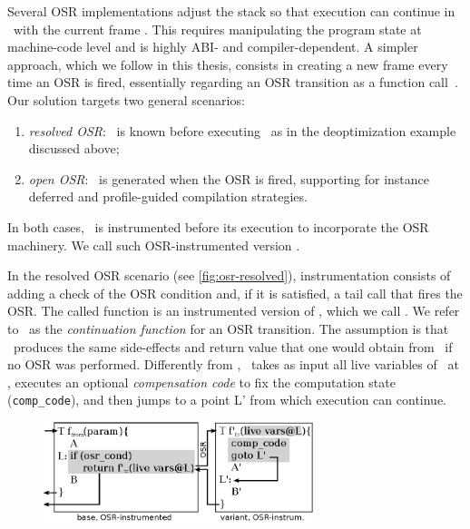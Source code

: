 Several OSR implementations adjust the stack so that execution can continue in \fvariant\ with the current frame \cite{Chambers91, Chambers92, Holzle92, Suganuma06}. This requires manipulating the program state at machine-code level and is highly ABI- and compiler-dependent. A simpler approach, which we follow in this thesis, consists in creating a new frame every time an OSR is fired, essentially regarding an OSR transition as a function call~\cite{Lameed13,Pizlo14}. Our solution targets two general scenarios:
\begin{enumerate}[parsep=0pt]
 \item {\em resolved OSR}: \fvariant\ is known before executing \fbase\ as in the deoptimization example discussed above;
 \item {\em open OSR}: \fvariant\ is generated when the OSR is fired, supporting for instance deferred and profile-guided compilation strategies.
\end{enumerate}

\noindent In both cases, \fbase\ is instrumented before its execution to incorporate the OSR machinery. We call such OSR-instrumented version \fosrfrom.

In the resolved OSR scenario (see \myfigure\ref{fig:osr-resolved}), instrumentation consists of adding a check of the OSR condition and, if it is satisfied, a tail call that fires the OSR. The called function is an instrumented version of \fvariant, which we call \fosrto. We refer to \fosrto\ as the {\em continuation function} for an OSR transition. The assumption is that \fosrto\ produces the same side-effects and return value that one would obtain from \fbase\ if no OSR was performed. Differently from \fvariant, \fosrto\ takes as input all live variables of \fbase\ at \osrpoint, executes an optional {\em compensation code} to fix the computation state ({\tt comp\_code}), and then jumps to a point \textsf{L'} from which execution can continue.

\ifdefined\noauthorea
\begin{figure}[b]
\begin{center}
\includegraphics[width=0.7\textwidth]{figures/osr-resolved/osr-resolved.eps}
\caption{\protect}
\end{center}
\end{figure}
\fi

